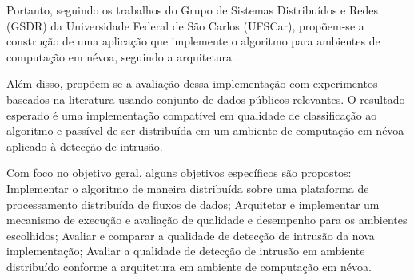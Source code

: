 Portanto, seguindo os trabalhos do Grupo de Sistemas Distribuídos e Redes (GSDR)
da Universidade Federal de São Carlos (UFSCar), 
propõem-se a construção de uma
aplicação que implemente o algoritmo \minas \cite{Faria2016minas} para ambientes
de computação em névoa, seguindo a
arquitetura \arch \cite{Cassales2019}.

Além disso, propõem-se a avaliação dessa implementação com experimentos
baseados na literatura usando conjunto de dados públicos relevantes.
O resultado esperado é uma implementação compatível em qualidade de
classificação ao algoritmo \minas e passível de ser distribuída em um ambiente de
computação em névoa aplicado à detecção de intrusão.

Com foco no objetivo geral, alguns objetivos específicos são propostos:
Implementar o algoritmo \minas de maneira distribuída sobre uma plataforma de
processamento distribuída de fluxos de dados;
Arquitetar e implementar um mecanismo de execução e avaliação de qualidade e
desempenho para os ambientes escolhidos;
Avaliar e comparar a qualidade de detecção de intrusão da nova implementação;
Avaliar a qualidade de detecção de intrusão em ambiente distribuído conforme a
arquitetura \arch em ambiente de computação em névoa.


